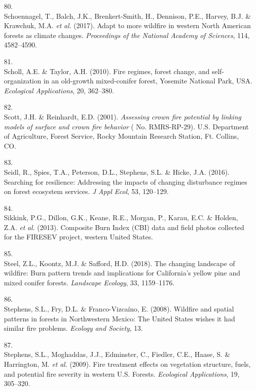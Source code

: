 \documentclass[]{article}
\begin{document}
\leavevmode\hypertarget{ref-schoennagel2017}{}%
80.\\
Schoennagel, T., Balch, J.K., Brenkert-Smith, H., Dennison, P.E.,
Harvey, B.J. \& Krawchuk, M.A. \emph{et al.} (2017). Adapt to more
wildfire in western North American forests as climate changes.
\emph{Proceedings of the National Academy of Sciences}, 114, 4582--4590.

\leavevmode\hypertarget{ref-scholl2010}{}%
81.\\
Scholl, A.E. \& Taylor, A.H. (2010). Fire regimes, forest change, and
self-organization in an old-growth mixed-conifer forest, Yosemite
National Park, USA. \emph{Ecological Applications}, 20, 362--380.

\leavevmode\hypertarget{ref-scott2001}{}%
82.\\
Scott, J.H. \& Reinhardt, E.D. (2001). \emph{Assessing crown fire
potential by linking models of surface and crown fire behavior} ( No.
RMRS-RP-29). U.S. Department of Agriculture, Forest Service, Rocky
Mountain Research Station, Ft. Collins, CO.

\leavevmode\hypertarget{ref-seidl2016b}{}%
83.\\
Seidl, R., Spies, T.A., Peterson, D.L., Stephens, S.L. \& Hicke, J.A.
(2016). Searching for resilience: Addressing the impacts of changing
disturbance regimes on forest ecosystem services. \emph{J Appl Ecol},
53, 120--129.

\leavevmode\hypertarget{ref-sikkink2013}{}%
84.\\
Sikkink, P.G., Dillon, G.K., Keane, R.E., Morgan, P., Karau, E.C. \&
Holden, Z.A. \emph{et al.} (2013). Composite Burn Index (CBI) data and
field photos collected for the FIRESEV project, western United States.

\leavevmode\hypertarget{ref-steel2018}{}%
85.\\
Steel, Z.L., Koontz, M.J. \& Safford, H.D. (2018). The changing
landscape of wildfire: Burn pattern trends and implications for
California's yellow pine and mixed conifer forests. \emph{Landscape
Ecology}, 33, 1159--1176.

\leavevmode\hypertarget{ref-stephens2008}{}%
86.\\
Stephens, S.L., Fry, D.L. \& Franco-Vizcaíno, E. (2008). Wildfire and
spatial patterns in forests in Northwestern Mexico: The United States
wishes it had similar fire problems. \emph{Ecology and Society}, 13.

\leavevmode\hypertarget{ref-stephens2009}{}%
87.\\
Stephens, S.L., Moghaddas, J.J., Edminster, C., Fiedler, C.E., Haase, S.
\& Harrington, M. \emph{et al.} (2009). Fire treatment effects on
vegetation structure, fuels, and potential fire severity in western U.S.
Forests. \emph{Ecological Applications}, 19, 305--320.
\end{document}
